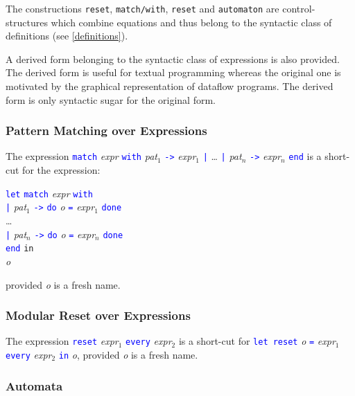 \documentclass[11pt,titlepage,twoside]{report}
\makeatletter
\newcommand{\zls}[1]{{\@span{class="zelusinline"}#1}}
\newcommand{\zls}[1]{\texttt{#1}}
\renewcommand{\zls}[1]{\texttt{#1}}
\newcommand{\In}{\mbox{{\tt in}}}
\newcommand{\Minusgreater}{\mbox{{\tt ->}}}
\newcommand{\term}[1]{\textcolor{Blue}{\tt #1}}
\newcommand{\nterm}[1]{\textcolor{BrickRed}{\it #1}}
\newcommand{\term}[1]{{\tt #1}}
\newcommand{\nterm}[1]{{\em #1}}
\makeatother
\begin{document}
The constructions \zls{reset}, \zls{match/with}, \zls{reset} and
\zls{automaton} are control-structures which combine equations and
thus belong to the syntactic class of definitions (see
\cref{definitions}).

A derived form belonging to the syntactic class of expressions is also
provided. The derived form is useful for textual programming whereas
the original one is motivated by the graphical representation of
dataflow programs. The derived form is only syntactic sugar for the
original form.

\subsubsection{Pattern Matching over Expressions} %

The expression
\term{match} \nterm{expr} \term{with} 
  \nterm{pat}$_1$ \term{\Minusgreater} \nterm{expr}$_1$ \term{|} \dots 
\term{|} \nterm{pat}$_n$ \term{\Minusgreater} \nterm{expr}$_n$ \term{end}
is a short-cut for the expression:

\begin{center}
\begin{tabbing}
\term{let} \= \term{match} \nterm{expr} \term{with} \\ 
           \> \term{|} \nterm{pat}$_1$ \term{\Minusgreater} 
               \term{do} \nterm{o} \term{=} \nterm{expr}$_1$ \term{done} \\
           \> \dots \\
           \> \term{|} \nterm{pat}$_n$ \term{\Minusgreater} 
               \term{do} \nterm{o} \term{=} \nterm{expr}$_n$ \term{done} \\
           \> \term{end} \In \\
\nterm{o}
\end{tabbing}
\end{center}
provided \nterm{o} is a fresh name.

\subsubsection{Modular Reset over Expressions} %

The expression \term{reset} \nterm{expr}$_1$ \term{every} \nterm{expr}$_2$
is a short-cut for
\term{let reset} \nterm{o} \term{=} \nterm{expr}$_1$ 
\term{every} \nterm{expr}$_2$ \term{in} \nterm{o},
provided \nterm{o} is a fresh name.

\subsubsection{Automata} %
\end{document}
